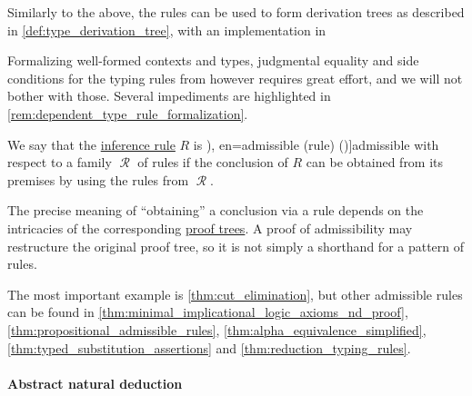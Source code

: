 \begin{remark}
\begin{itemize}
    Similarly to the above, the rules can be used to form derivation trees as described in \cref{def:type_derivation_tree}, with an implementation in
    \begin{CodeRefDisplay}
    \end{CodeRefDisplay}

    Formalizing well-formed contexts and types, judgmental equality and side conditions for the typing rules from  however requires great effort, and we will not bother with those. Several impediments are highlighted in \cref{rem:dependent_type_rule_formalization}.
  \end{itemize}
\end{remark}

\begin{concept}\label{con:inference_rule_admissibility}\mimprovised
  We say that the \hyperref[def:inference_rule]{inference rule} \( R \) is \term[ru=допустимое (правило) (\cite[53]{Герасимов2014Вычислимость}), en=admissible (rule) (\cite[76]{TroelstraSchwichtenberg2000BasicProofTheory})]{admissible} with respect to a family \( \mscrR \) of rules if the conclusion of \( R \) can be obtained from its premises by using the rules from \( \mscrR \).
\end{concept}
\begin{comments}
  \item The precise meaning of \enquote{obtaining} a conclusion via a rule depends on the intricacies of the corresponding \hyperref[def:proof_tree]{proof trees}. A proof of admissibility may restructure the original proof tree, so it is not simply a shorthand for a pattern of rules.

  The most important example is \cref{thm:cut_elimination}, but other admissible rules can be found in \cref{thm:minimal_implicational_logic_axioms_nd_proof}, \cref{thm:propositional_admissible_rules}, \cref{thm:alpha_equivalence_simplified}, \cref{thm:typed_substitution_assertions} and \cref{thm:reduction_typing_rules}.
\end{comments}

\paragraph{Abstract natural deduction}

